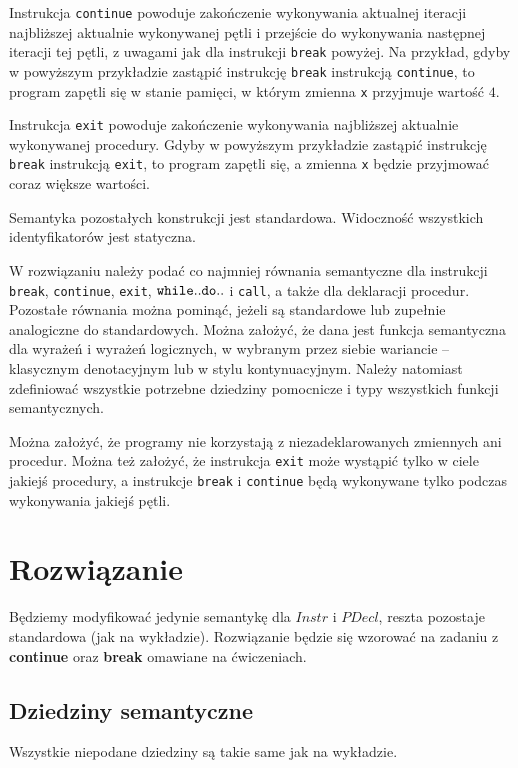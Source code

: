 \documentclass{article}
\begin{document}
   Instrukcja {\tt continue} powoduje zakończenie wykonywania aktualnej iteracji najbliższej aktualnie wykonywanej pętli i przejście do wykonywania następnej iteracji tej pętli, z uwagami jak dla instrukcji {\tt break} powyżej. Na przykład, gdyby w powyższym przykładzie zastąpić instrukcję {\tt break} instrukcją {\tt continue}, to program zapętli się w stanie pamięci, w którym zmienna {\tt x} przyjmuje wartość $4$.

   Instrukcja {\tt exit} powoduje zakończenie wykonywania najbliższej aktualnie wykonywanej procedury. Gdyby w powyższym przykładzie zastąpić instrukcję {\tt break} instrukcją {\tt exit}, to program zapętli się, a zmienna {\tt x} będzie przyjmować coraz większe wartości.

   Semantyka pozostałych konstrukcji jest standardowa. Widoczność wszystkich identyfikatorów jest statyczna.

   W rozwiązaniu należy podać co najmniej równania semantyczne dla instrukcji {\tt break}, {\tt continue}, {\tt exit}, ${\tt while..do..}$ i {\tt call}, a także dla deklaracji procedur. Pozostałe równania można pominąć, jeżeli są standardowe lub zupełnie analogiczne do standardowych. Można założyć, że dana jest funkcja semantyczna dla wyrażeń i wyrażeń logicznych, w wybranym przez siebie wariancie -- klasycznym denotacyjnym lub w stylu kontynuacyjnym. Należy natomiast zdefiniować wszystkie potrzebne dziedziny pomocnicze i typy wszystkich funkcji semantycznych.

   Można założyć, że programy nie korzystają z niezadeklarowanych zmiennych ani procedur. Można też założyć, że instrukcja {\tt exit} może wystąpić tylko w ciele jakiejś procedury, a instrukcje {\tt break} i {\tt continue} będą wykonywane tylko podczas wykonywania jakiejś pętli.


   \newpage
   \section{Rozwiązanie}

   Będziemy modyfikować jedynie semantykę dla $Instr$ i $PDecl$, reszta pozostaje standardowa
   (jak na wykładzie).
   Rozwiązanie będzie się wzorować na zadaniu z {\bf continue} oraz {\bf break} omawiane na ćwiczeniach.

   \subsection{Dziedziny semantyczne}

   Wszystkie niepodane dziedziny są takie same jak na wykładzie.
\end{document}
